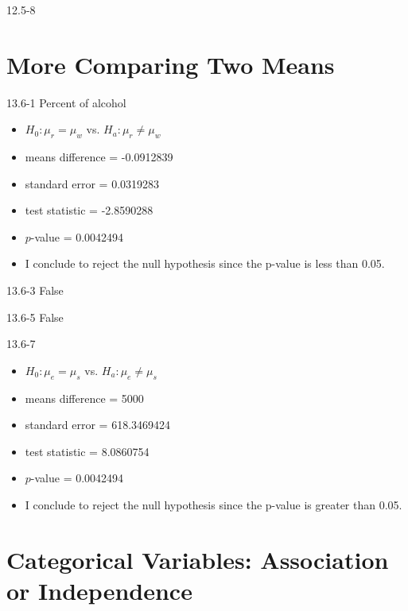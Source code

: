 \begin{exsol@solution}{12.5-8}

\end{exsol@solution}
\setcounter{chapter}{12}\chapter{More Comparing Two Means}
\begin{exsol@solution}{13.6-1}
Percent of alcohol

\begin{itemize}
  \item $H_0: \mu_r = \mu_w$ vs. $H_a: \mu_r \ne \mu_w$
  \item  means difference = -0.0912839
  \item  standard error  = 0.0319283
  \item  test statistic = -2.8590288
  \item  $p$-value = 0.0042494
  \item  I conclude to reject the null hypothesis since the p-value is less than 0.05.
\end{itemize}

\end{exsol@solution}
\begin{exsol@solution}{13.6-3}
False

\end{exsol@solution}
\begin{exsol@solution}{13.6-5}
False

\end{exsol@solution}
\begin{exsol@solution}{13.6-7}
\begin{itemize}
  \item $H_0: \mu_e = \mu_s$ vs. $H_a: \mu_e \ne \mu_s$
  \item  means difference = 5000
  \item  standard error  = 618.3469424
  \item  test statistic = 8.0860754
  \item  $p$-value = 0.0042494
  \item  I conclude to reject the null hypothesis since the p-value is greater than 0.05.
\end{itemize}

\end{exsol@solution}
\setcounter{chapter}{13}\chapter{Categorical Variables: Association or Independence}
